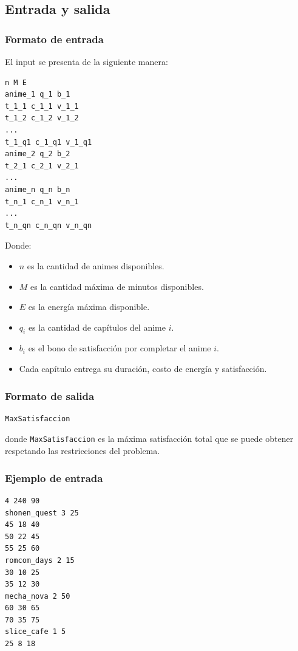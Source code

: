 \subsection{Entrada y salida}

\subsubsection*{Formato de entrada}

El input se presenta de la siguiente manera:

\begin{verbatim}
n M E
anime_1 q_1 b_1
t_1_1 c_1_1 v_1_1
t_1_2 c_1_2 v_1_2
...
t_1_q1 c_1_q1 v_1_q1
anime_2 q_2 b_2
t_2_1 c_2_1 v_2_1
...
anime_n q_n b_n
t_n_1 c_n_1 v_n_1
...
t_n_qn c_n_qn v_n_qn
\end{verbatim}

Donde:

\begin{itemize}
    \item $n$ es la cantidad de animes disponibles.
    \item $M$ es la cantidad máxima de minutos disponibles.
    \item $E$ es la energía máxima disponible.
    \item $q_i$ es la cantidad de capítulos del anime $i$.
    \item $b_i$ es el bono de satisfacción por completar el anime $i$.
    \item Cada capítulo entrega su duración, costo de energía y satisfacción.
\end{itemize}

\subsubsection*{Formato de salida}

\begin{verbatim}
MaxSatisfaccion
\end{verbatim}

donde \texttt{MaxSatisfaccion} es la máxima satisfacción total que se puede obtener respetando las restricciones del problema.

\subsubsection*{Ejemplo de entrada}

\begin{verbatim}
4 240 90
shonen_quest 3 25
45 18 40
50 22 45
55 25 60
romcom_days 2 15
30 10 25
35 12 30
mecha_nova 2 50
60 30 65
70 35 75
slice_cafe 1 5
25 8 18
\end{verbatim}

